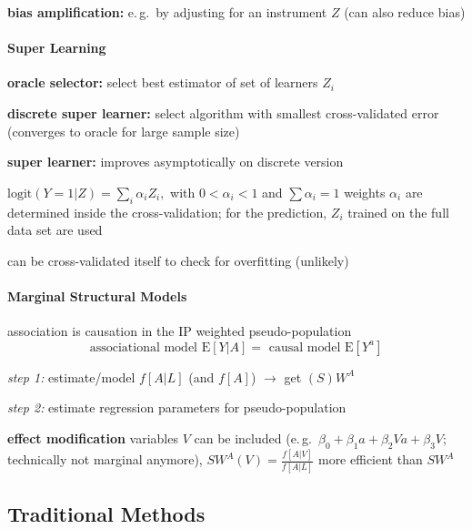 \documentclass[8pt,twoside]{extarticle}
\begin{document}
\begin{multicols}{2}
\noindent \textbf{bias amplification:} e.\,g.\ by adjusting for an instrument $Z$ (can also reduce bias)



\paragraph{Super Learning} \citep{van2007super, van2011targeted}

\noindent \textbf{oracle selector:} select best estimator of set of learners $Z_i$

\noindent \textbf{discrete super learner:} select algorithm with smallest cross-validated error (converges to oracle for large sample size)

\noindent \textbf{super learner:} improves asymptotically on discrete version

$\mathrm{logit} (Y=1|Z) = \sum_i \alpha_i Z_i, $ with $0<\alpha_i<1$ and $\sum\alpha_i=1$
weights $\alpha_i$ are determined inside the cross-validation; for the prediction, $Z_i$ trained on the full data set are used

\noindent   can be cross-validated itself to check for overfitting (unlikely)


\paragraph{Marginal Structural Models} association is causation in the IP weighted pseudo-population 
$$\text{associational model } \mathrm{E}\left[Y|A\right] = \text{ causal model } \mathrm{E}\left[Y^a\right]$$

\noindent \textit{step 1:} estimate/model $f\left[A|L\right]$ (and $f\left[A\right]$) $\rightarrow$ get $(S)W^A$

\noindent \textit{step 2:} estimate regression parameters for pseudo-population

\noindent \textbf{effect modification} variables $V$ can be included (e.\,g.\ $\beta_0+\beta_1 a+\beta_2 V a + \beta_3 V$; technically not marginal anymore), $SW^A(V) = \frac{f\left[A|V\right]}{f\left[A|L\right]}$ more efficient than $SW^A$
 










\end{multicols}

\subsection{Traditional Methods}
\end{document}
